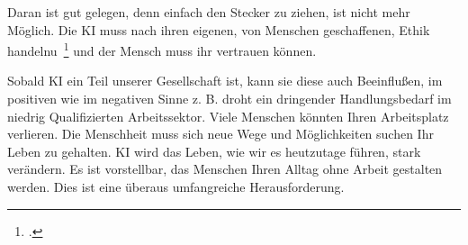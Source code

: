 Daran ist gut gelegen, denn einfach den Stecker zu ziehen, ist nicht mehr Möglich. Die \ac{KI} muss nach ihren eigenen, von Menschen geschaffenen, 
Ethik handelnu~\footcite[\vglf][]{Wittpahl.2018} und der Mensch muss ihr vertrauen können.


Sobald \ac{KI} ein Teil unserer Gesellschaft ist, kann sie diese auch Beeinflußen, im positiven wie im negativen Sinne z. B. droht ein dringender Handlungsbedarf
im niedrig Qualifizierten Arbeitssektor. Viele Menschen könnten Ihren Arbeitsplatz verlieren. Die Menschheit muss sich neue Wege und Möglichkeiten suchen Ihr Leben zu 
gehalten. \ac{KI} wird das Leben, wie wir es heutzutage führen, stark verändern. Es ist vorstellbar, das Menschen Ihren Alltag ohne Arbeit gestalten werden. Dies ist eine
überaus umfangreiche Herausforderung.


